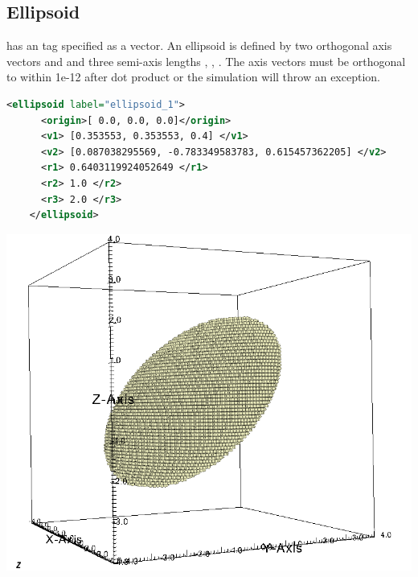 \subsection{Ellipsoid}
\begin{minipage}{0.6\textwidth}
   has an  tag specified as a vector.  
  An ellipsoid is defined by two orthogonal axis vectors  and
   and three semi-axis lengths , , .
  The axis vectors must be orthogonal to within 1e-12 after dot product or 
  the simulation will throw an exception.  
  \begin{lstlisting}[language=XML]
    <ellipsoid label="ellipsoid_1">
      <origin>[ 0.0, 0.0, 0.0]</origin>
      <v1> [0.353553, 0.353553, 0.4] </v1>
      <v2> [0.087038295569, -0.783349583783, 0.615457362205] </v2>
      <r1> 0.6403119924052649 </r1>
      <r2> 1.0 </r2>
      <r3> 2.0 </r3>
    </ellipsoid>
  \end{lstlisting}
\end{minipage}
\begin{minipage}{0.4\textwidth}
  \centering
  \includegraphics[width=0.9\columnwidth]{FIGS/geometry/geom_ellipsoid.png}
\end{minipage}

